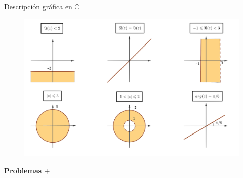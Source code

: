 \begin{myalertblock}{Descripción gráfica en $\boldsymbol{ \mathbb C }$}

\begin{figure}[H]
	\centering
	\includegraphics[width=1\textwidth]{img-c/comp16.png}
\end{figure}
	
\end{myalertblock}




\vspace{3cm} %
\begin{adjustwidth}{50pt}{250pt}
\begin{cuadro-naranja}
\textbf{\huge{Problemas $\boldsymbol{+}$}}\normalsize{$\, $}
\end{cuadro-naranja}	
\end{adjustwidth}

